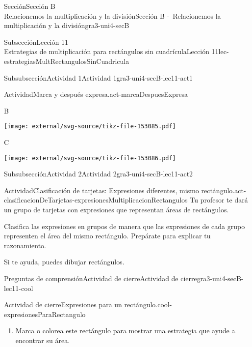 \begin{sectionptx}{Sección}{{\Large Sección B\\}Relacionemos la multiplicación y la división}{}{Sección B -~Relacionemos la multiplicación y la división}{}{}{gra3-uni4-secB}
\begin{subsectionptx}{Subsección}{{\normalsize Lección 11\\[-0.05cm]}Estrategias de multiplicación para rectángulos sin cuadrícula}{}{Lección 11}{}{}{lec-estrategiasMultRectangulosSinCuadricula}
\begin{subsubsectionptx}{Subsubsección}{Actividad 1}{}{Actividad 1}{}{}{gra3-uni4-secB-lec11-act1}
\begin{activity}{Actividad}{Marca y después expresa.}{act-marcaDespuesExpresa}
\begin{sidebyside}{3}{0}{0}{0}
\begin{sbspanel}{0.261}%
B%
\par
\texttt{[image: external/svg-source/tikz-file-153085.pdf]}
\end{sbspanel}%
\begin{sbspanel}{0.348}%
C%
\par
\texttt{[image: external/svg-source/tikz-file-153086.pdf]}
\end{sbspanel}%
\end{sidebyside}%
\end{activity}%
\end{subsubsectionptx}
%
%
\typeout{************************************************}
\typeout{************************************************}
%
\begin{subsubsectionptx}{Subsubsección}{Actividad 2}{}{Actividad 2}{}{}{gra3-uni4-secB-lec11-act2}
\begin{activity}{Actividad}{Clasificación de tarjetas: Expresiones diferentes, mismo rectángulo.}{act-clasificacionDeTarjetas-expresionesMultiplicacionRectangulos}%
Tu profesor te dará un grupo de tarjetas con expresiones que representan áreas de rectángulos.%
\par
Clasifica las expresiones en grupos de manera que las expresiones de cada grupo representen el área del mismo rectángulo. Prepárate para explicar tu razonamiento.%
\par
Si te ayuda, puedes dibujar rectángulos.%
\end{activity}%
\end{subsubsectionptx}
%
%
\typeout{************************************************}
\typeout{************************************************}
%
\begin{reading-questions-subsubsection}{Preguntas de comprensión}{Actividad de cierre}{}{Actividad de cierre}{}{}{gra3-uni4-secB-lec11-cool}
\begin{project}{Actividad de cierre}{Expresiones para un rectángulo.}{cool-expresionesParaRectangulo}%
\begin{sidebyside}{2}{0}{0}{0}%
\begin{sbspanel}{0.6}%
%
\begin{enumerate}[label={(\alph*)}]
\item{}Marca o colorea este rectángulo para mostrar una estrategia que ayude a encontrar su área.%

\end{enumerate}
\end{sbspanel}
\end{sidebyside}
\end{project}
\end{reading-questions-subsubsection}
\end{subsectionptx}
\end{sectionptx}
